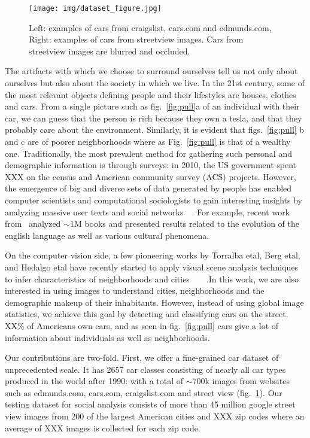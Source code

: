 \documentclass[10pt,twocolumn,letterpaper]{article}
\begin{document}
\begin{figure}[t]
\begin{center}
   \texttt{[image: img/dataset\_figure.jpg]}
\end{center}
   \caption{Left: examples of cars from craigslist, cars.com and edmunds.com, Right: examples of cars from streetview images. Cars from streetview images are blurred and occluded.}
\label{fig:dataset1}
\end{figure}
The artifacts with which we choose to surround ourselves tell us not only about ourselves but also about the society in which we live. In the 21st century, some of the most relevant objects defining people and their lifestyles are houses, clothes and cars. From a single picture such as fig.~\ref{fig:pull}a of an individual with their car, we can guess that the person is rich because they own a tesla, and that they probably care about the environment. Similarly, it is evident that figs.~\ref{fig:pull} b and c are of poorer neighborhoods where as Fig.~\ref{fig:pull} is that of a wealthy one. Traditionally, the most prevalent method for gathering such personal and demographic information is through surveys: in 2010, the US government spent XXX on the census and American community survey (ACS) projects. However, the emergence of big and diverse sets of data generated by people has enabled computer scientists and computational sociologists to gain interesting insights by analyzing massive user texts and social networks~\cite{jure}~\cite{nlp_people}. For example, recent work from~\cite{ngrams} analyzed \(\sim 1\)M books and presented results related to the evolution of the english language as well as various cultural phenomena.

On the computer vision side, a few pioneering works by Torralba etal, Berg etal, and Hedalgo etal have recently started to apply visual scene analysis techniques to infer characteristics of neighborhoods and cities~\cite{antonio}~\cite{mcdonalds}~\cite{mit_cvpr}~\cite{tamara}.In this work, we are also interested in using images to understand cities, neighborhoods and the demographic makeup of their inhabitants. However, instead of using global image statistics, we achieve this goal by detecting and classifying cars on the street. XX\% of Americans own cars, and as seen in fig.~\ref{fig:pull} cars give a lot of information about individuals as well as neighborhoods.

Our contributions are two-fold. First, we offer a fine-grained car dataset of unprecedented scale. It has 2657 car classes consisting of nearly all car types produced in the world after 1990: with a total of \(\sim 700\)k images from websites such as edmunds.com, cars.com, craigslist.com and street view (fig.~\ref{fig:dataset1}). Our testing dataset for social analysis consists of more than 45 million google street view images from 200 of the largest American cities and XXX zip codes where an average of XXX images is collected for each zip code.
\end{document}
